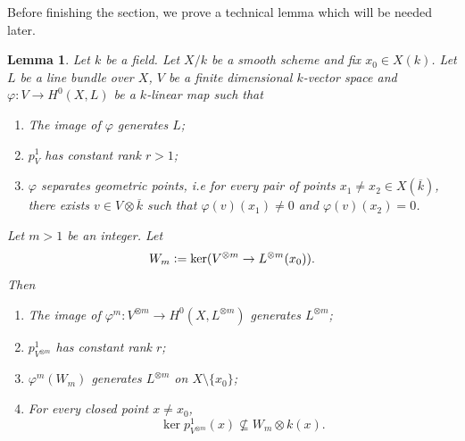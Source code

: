 \documentclass[a4paper,12pt]{amsart}
\newtheorem{lemma}[definition]{Lemma}
\numberwithin{equation}{section}
\newcommand{\defeq}{\vcentcolon=}
\renewcommand{\_}{\rule{0.25cm}{0.4pt}}
\begin{document}
Before finishing the section, we prove a technical lemma which will be needed later.

\begin{lemma}\label{potencia boa}
Let $k$ be a field. Let $X/k$ be a smooth scheme and fix $x_{0}\in X(k)$. Let $L$ be a line bundle over $X$, $V$ be a finite dimensional $k$-vector space and $\varphi\colon V\to H^{0}(X,L)$ be a $k$-linear map such that
\begin{enumerate}
    \item The image of $\varphi$ generates $L$;
    \item $p^{1}_{V}$ has constant rank $r>1$;
    \item $\varphi$ separates geometric points, i.e for every pair of points $x_{1}\neq x_{2}\in X(\overline{k})$, there exists $v\in V\otimes \overline{k}$ such that $\varphi(v)(x_{1})\neq 0$ and $\varphi(v)(x_{2})=0$.
\end{enumerate}
 Let $m>1$ be an integer. Let
\[
W_{m}\defeq \ker(V^{\otimes m}\to L^{\otimes m}(x_{0})).
\]
Then
\begin{enumerate}
    \item The image of $\varphi^{m}\colon V^{\otimes m}\to H^{0}(X,L^{\otimes m})$ generates $L^{\otimes m}$;
    \item $p^{1}_{V^{\otimes m}}$ has constant rank $r$;
    \item $\varphi^{m}(W_{m})$ generates $L^{\otimes m}$ on $X\setminus \{x_{0}\}$;
    \item For every closed point $x\neq x_{0}$,
    \[
    \ker p^{1}_{V^{\otimes m}}(x)\not\subseteq W_{m}\otimes k(x).
    \]
\end{enumerate}
\end{lemma}
\end{document}
